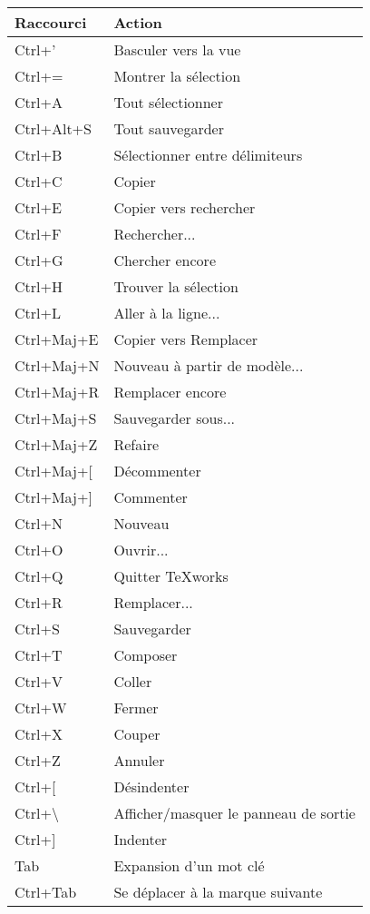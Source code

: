 \begin{longtable}{Pl}
\toprule
Raccourci     & Action \\
\midrule \endhead
Ctrl+'              & Basculer vers la vue \\
Ctrl+=              & Montrer la sélection \\
Ctrl+A              & Tout sélectionner \\
Ctrl+Alt+S          & Tout sauvegarder \\
Ctrl+B              & Sélectionner entre délimiteurs \\
Ctrl+C              & Copier \\
Ctrl+E              & Copier vers rechercher \\
Ctrl+F              & Rechercher... \\
Ctrl+G              & Chercher encore \\
Ctrl+H              & Trouver la sélection \\
Ctrl+L              & Aller à la ligne... \\
Ctrl+Maj+E          & Copier vers Remplacer \\
Ctrl+Maj+N          & Nouveau à partir de modèle... \\
Ctrl+Maj+R          & Remplacer encore \\
Ctrl+Maj+S          & Sauvegarder sous... \\
Ctrl+Maj+Z          & Refaire \\
Ctrl+Maj+[          & Décommenter \\
Ctrl+Maj+]          & Commenter \\
Ctrl+N              & Nouveau \\
Ctrl+O              & Ouvrir... \\
Ctrl+Q              & Quitter TeXworks \\
Ctrl+R              & Remplacer... \\
Ctrl+S              & Sauvegarder \\
Ctrl+T              & Composer \\
Ctrl+V              & Coller \\
Ctrl+W              & Fermer \\
Ctrl+X              & Couper \\
Ctrl+Z              & Annuler \\
Ctrl+[              & Désindenter \\
Ctrl+\textbackslash & Afficher/masquer le panneau de sortie \\
Ctrl+]              & Indenter \\
Tab                 & Expansion d'un mot clé\\
Ctrl+Tab            & Se déplacer à la marque suivante\\
\bottomrule
\end{longtable}
